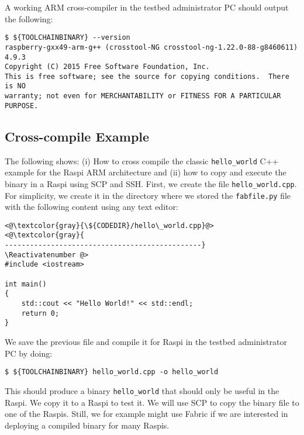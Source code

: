 A working ARM cross-compiler in the testbed administrator \ac{PC} should
output the following:

\begin{lstlisting}[]
$ ${TOOLCHAINBINARY} --version
raspberry-gxx49-arm-g++ (crosstool-NG crosstool-ng-1.22.0-88-g8460611) 4.9.3
Copyright (C) 2015 Free Software Foundation, Inc.
This is free software; see the source for copying conditions.  There is NO
warranty; not even for MERCHANTABILITY or FITNESS FOR A PARTICULAR PURPOSE.
\end{lstlisting}
\FloatBarrier
\vspace{-5mm}

\subsection{Cross-compile Example}
The following shows: (i) How to cross compile the classic \texttt{hello\_world}
C++ example for the \ac{Raspi} ARM architecture and (ii) how to copy and
execute the binary in a \ac{Raspi} using \ac{SCP} and \ac{SSH}. First, we
create the file \texttt{hello\_world.cpp}. For simplicity, we create it
in the directory where we stored the \texttt{fabfile.py} file
with the following content using any text editor:

\Suppressnumber\begin{lstlisting}[]
<@\textcolor{gray}{\${CODEDIR}/hello\_world.cpp}@>
<@\textcolor{gray}{
-----------------------------------------------}
\Reactivatenumber @>
#include <iostream>

int main()
{
    std::cout << "Hello World!" << std::endl;
    return 0;
}
\end{lstlisting}
\FloatBarrier
\vspace{-5mm}

We save the previous file and compile it for \ac{Raspi} in the testbed
administrator \ac{PC} by doing:

\begin{lstlisting}[]
$ ${TOOLCHAINBINARY} hello_world.cpp -o hello_world
\end{lstlisting}
\FloatBarrier
\vspace{-5mm}

This should produce a binary \texttt{hello\_world} that should only be
useful in the \ac{Raspi}. We copy it to a \ac{Raspi} to test it. We will
use \ac{SCP} to copy the binary file to one of the \ac{Raspi}s. Still, we
for example might use Fabric if we are interested in deploying a compiled
binary for many \ac{Raspi}s.

